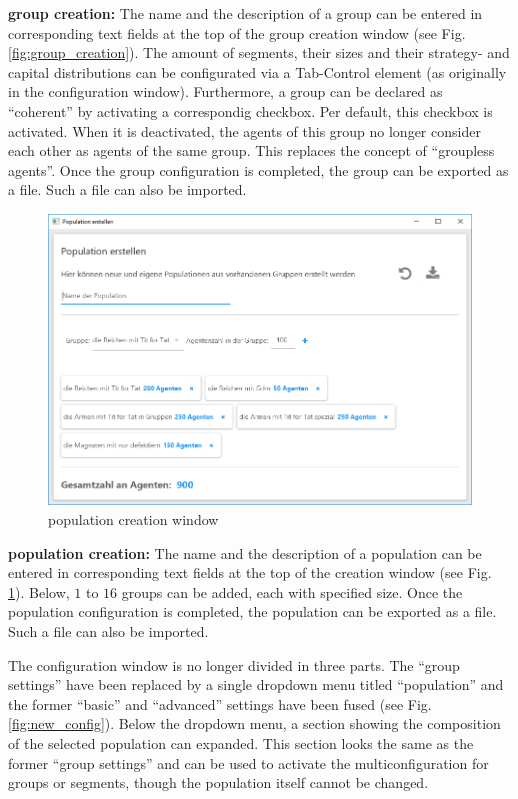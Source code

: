 \documentclass[parskip=full,11pt]{scrartcl}
\begin{document}
\textbf{group creation:}
The name and the description of a group can be entered in corresponding text fields at the top of the group creation window (see Fig. \ref{fig:group_creation}). The amount of segments, their sizes and their strategy- and capital distributions can be configurated via a Tab-Control element (as originally in the configuration window). Furthermore, a group can be declared as \enquote{coherent} by activating a correspondig checkbox. Per default, this checkbox is activated. When it is deactivated, the agents of this group no longer consider each other as agents of the same group. This replaces the concept of \enquote{groupless agents}. Once the group configuration is completed, the group can be exported as a file. Such a file can also be imported.

\begin{figure}[h]
	\centering
	\includegraphics[width = \linewidth]{images/population_window.png}
	\caption{population creation window}
	\label{fig:population_creation}
\end{figure}

\textbf{population creation:}
The name and the description of a population can be entered in corresponding text fields at the top of the creation window (see Fig. \ref{fig:population_creation}). Below, \(1\) to \(16\) groups can be added, each with specified size. Once the population configuration is completed, the population can be exported as a file. Such a file can also be imported.

The configuration window is no longer divided in three parts. The \enquote{group settings} have been replaced by a single dropdown menu titled \enquote{population} and the former \enquote{basic} and \enquote{advanced} settings have been fused (see Fig. \ref{fig:new_config}). Below the dropdown menu, a section showing the composition of the selected population can expanded. This section looks the same as the former \enquote{group settings} and can be used to activate the multiconfiguration for groups or segments, though the population itself cannot be changed.
\end{document}
